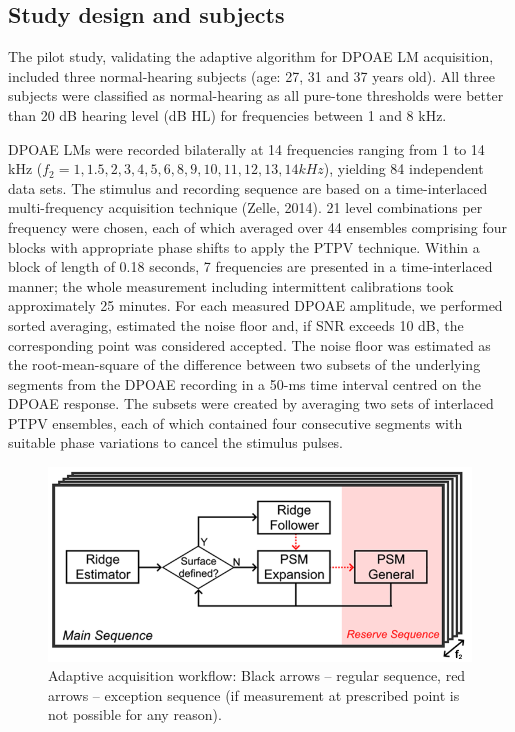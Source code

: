 \documentclass[journal,twoside,web]{ieeecolor2}
\begin{document}
\subsection{Study design and subjects}

The pilot study, validating the adaptive algorithm for DPOAE LM acquisition, included three normal-hearing subjects (age: 27, 31 and 37 years old).
All three subjects were classified as normal-hearing as all pure-tone thresholds were better than 20 dB hearing level (dB HL) for frequencies between 1 and 8 kHz.

DPOAE LMs were recorded bilaterally at 14 frequencies ranging from 1 to 14 kHz ($f_2 = 1, 1.5, 2, 3, 4, 5, 6, 8, 9, 10, 11, 12, 13, 14 kHz$), yielding 84 independent data sets.
The stimulus and recording sequence are based on a time-interlaced multi-frequency acquisition technique (Zelle, 2014).
 21 level combinations per frequency were chosen, each of which averaged over 44 ensembles comprising four blocks with appropriate phase shifts to apply the PTPV technique.
Within a block of length of 0.18 seconds, 7 frequencies are presented in a time-interlaced manner; the whole measurement including intermittent calibrations took approximately 25 minutes.
For each measured DPOAE amplitude, we performed sorted averaging, estimated the noise floor and, if SNR exceeds 10 dB, the corresponding point was considered accepted.
The noise floor was estimated as the root-mean-square of the difference between two subsets of the underlying segments from the DPOAE recording in a 50-ms time interval centred on the DPOAE response.
The subsets were created by averaging two sets of interlaced PTPV ensembles, each of which contained four consecutive segments with suitable phase variations to cancel the stimulus pulses.


\begin{figure}[ht]
\centerline{\includegraphics[width=\columnwidth]{Fig_Sequence.png}}
\caption{Adaptive acquisition workflow: Black arrows – regular sequence, red arrows – exception sequence (if measurement at prescribed point is not possible for any reason).}
\label{fig_SQS}
\end{figure}
\end{document}
